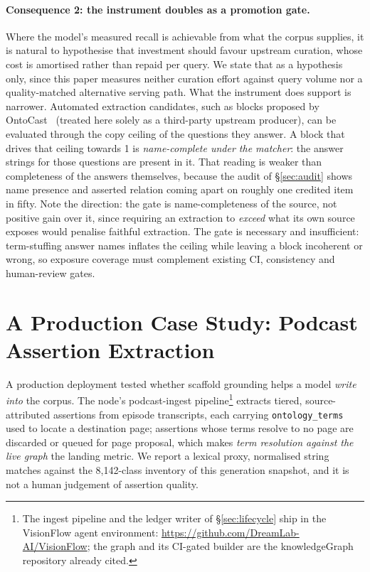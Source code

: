 \documentclass[10pt,twocolumn]{article}
\begin{document}
\paragraph{Consequence 2: the instrument doubles as a promotion gate.} Where the model's measured recall is achievable from what the corpus supplies, it is natural to hypothesise that investment should favour upstream curation, whose cost is amortised rather than repaid per query. We state that as a hypothesis only, since this paper measures neither curation effort against query volume nor a quality-matched alternative serving path. What the instrument does support is narrower. Automated extraction candidates, such as blocks proposed by OntoCast~\cite{ontocast} (treated here solely as a third-party upstream producer), can be evaluated through the copy ceiling of the questions they answer. A block that drives that ceiling towards 1 is \emph{name-complete under the matcher}: the answer strings for those questions are present in it. That reading is weaker than completeness of the answers themselves, because the audit of \S\ref{sec:audit} shows name presence and asserted relation coming apart on roughly one credited item in fifty. Note the direction: the gate is name-completeness of the source, not positive gain over it, since requiring an extraction to \emph{exceed} what its own source exposes would penalise faithful extraction. The gate is necessary and insufficient: term-stuffing answer names inflates the ceiling while leaving a block incoherent or wrong, so exposure coverage must complement existing CI, consistency and human-review gates.

\section{A Production Case Study: Podcast Assertion Extraction}\label{sec:casestudy}
A production deployment tested whether scaffold grounding helps a model \emph{write into} the
corpus. The node's podcast-ingest pipeline\footnote{The ingest pipeline and the ledger writer of
\S\ref{sec:lifecycle} ship in the VisionFlow agent environment:
\url{https://github.com/DreamLab-AI/VisionFlow}; the graph and its CI-gated builder are the
knowledgeGraph repository already cited.} extracts tiered, source-attributed assertions from
episode transcripts, each carrying \texttt{ontology\_terms} used to locate a destination page;
assertions whose terms resolve to no page are discarded or queued for page proposal, which makes
\emph{term resolution against the live graph} the landing metric. We report a lexical proxy,
normalised string matches against the 8{,}142-class inventory of this generation snapshot, and it is
not a human judgement of assertion quality.
\end{document}
